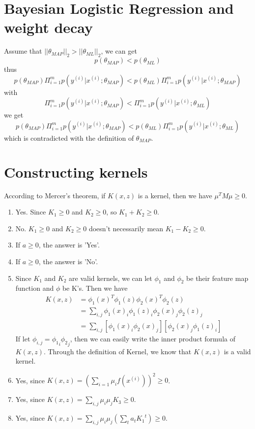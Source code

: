 \documentclass[12pt]{article}
\begin{document}
    \newpage
    \section*{Bayesian Logistic Regression and weight decay }
    Assume that $||\theta_{MAP}||_2 > ||\theta_{ML}||_2$,
    we can get $$p(\theta_{MAP}) < p(\theta_{ML})$$
    thus $$p(\theta_{MAP})\Pi_{i=1}^{m}p(y^{(i)}|x^{(i)};\theta_{MAP}) < p(\theta_{ML})\Pi_{i=1}^{m}p(y^{(i)}|x^{(i)};\theta_{MAP})$$
    with $$\Pi_{i=1}^{m}p(y^{(i)}|x^{(i)};\theta_{MAP}) < \Pi_{i=1}^{m}p(y^{(i)}|x^{(i)};\theta_{ML})$$
    we get $$p(\theta_{MAP})\Pi_{i=1}^{m}p(y^{(i)}|x^{(i)};\theta_{MAP}) < p(\theta_{ML})\Pi_{i=1}^{m}p(y^{(i)}|x^{(i)};\theta_{ML})$$
    which is contradicted with the definition of $\theta_{MAP}$.

    \section*{Constructing kernels}
    According to Mercer's theorem, if $K(x,z)$ is a kernel, then we have $\mu^T M \mu \geq 0$.
    \begin{enumerate}[label=(\alph*)]
        \item Yes. Since $K_1 \geq 0$ and $K_2 \geq 0$, so $K_1 + K_2 \geq 0$.
        \item No. $K_1 \geq 0$ and $K_2 \geq 0$ doesn't necessarily mean $K_1 - K_2 \geq 0$.
        \item If $a \geq 0$, the answer is 'Yes'. 
        \item If $a \geq 0$, the answer is 'No'.
        \item 
        Since $K_1$ and $K_2$ are valid kernels, we can let $\phi_1$ and $\phi_2$ be their feature map function and $\phi$ be K's.
        Then we have
        \begin{equation*}
            \begin{split}
                K(x,z) &= \phi_1(x)^T\phi_1(z)\phi_2(x)^T\phi_2(z) \\
                &= \sum_{i,j} \phi_1(x)_i\phi_1(z)_i\phi_2(x)_j\phi_2(z)_j \\
                &= \sum_{i,j} [\phi_1(x)_i\phi_2(x)_j][\phi_2(x)_j\phi_1(z)_i]
            \end{split}
        \end{equation*}
        If let $\phi_{i,j} =  {\phi_1}_i{\phi_2}_j $, then we can easily write the inner product formula of $K(x,z)$.
        Through the definition of Kernel, we know that $K(x,z)$ is a valid kernel.
        \item Yes, since $K(x,z) = (\sum_{i=1} \mu_i f(x^{(i)}))^2 \geq 0$.
        \item Yes, since $K(x,z) = \sum_{i,j} \mu_i \mu_j K_3 \geq 0$.
        \item Yes, since $K(x,z) = \sum_{i,j} \mu_i \mu_j (\sum_t a_t {K_1}^t) \geq 0$.
    \end{enumerate}
\end{document}
